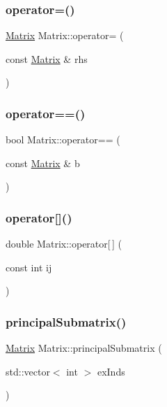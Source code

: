 \subsubsection{\texorpdfstring{operator=()}{operator=()}}
{\footnotesize\ttfamily \mbox{\hyperlink{class_matrix}{Matrix}} Matrix\+::operator= (\begin{DoxyParamCaption}\item[{const \mbox{\hyperlink{class_matrix}{Matrix}} \&}]{rhs }\end{DoxyParamCaption})}

\mbox{\label{class_matrix_a9094eaa5bbb1bdf4fb1811dfd163effb}} 
\subsubsection{\texorpdfstring{operator==()}{operator==()}}
{\footnotesize\ttfamily bool Matrix\+::operator== (\begin{DoxyParamCaption}\item[{const \mbox{\hyperlink{class_matrix}{Matrix}} \&}]{b }\end{DoxyParamCaption})}

\mbox{\label{class_matrix_a0a5a42b681f5ea018e1bc6b6453b86e2}} 
\subsubsection{\texorpdfstring{operator[]()}{operator[]()}}
{\footnotesize\ttfamily double Matrix\+::operator\mbox{[}$\,$\mbox{]} (\begin{DoxyParamCaption}\item[{const int}]{ij }\end{DoxyParamCaption})}

\mbox{\label{class_matrix_a98b1c60f665125f2da72069314794820}} 
\subsubsection{\texorpdfstring{principal\+Submatrix()}{principalSubmatrix()}}
{\footnotesize\ttfamily \mbox{\hyperlink{class_matrix}{Matrix}} Matrix\+::principal\+Submatrix (\begin{DoxyParamCaption}\item[{std\+::vector$<$ int $>$}]{ex\+Inds }\end{DoxyParamCaption})}

